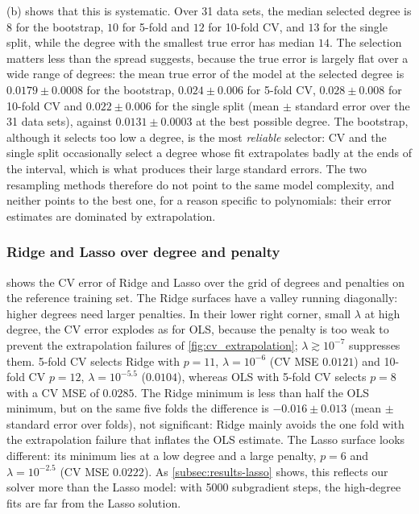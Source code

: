 (b) shows that this is systematic. Over 31 data sets,
the median selected degree is $8$ for the bootstrap, $10$ for 5-fold and $12$ for
10-fold CV, and $13$ for the single split, while the degree with the smallest
true error has median $14$. The selection matters less than the spread
suggests, because the true error is largely flat over a wide range of degrees: the mean
true error of the model at the selected degree is $0.0179\pm0.0008$ for the
bootstrap, $0.024\pm0.006$ for 5-fold CV, $0.028\pm0.008$ for 10-fold CV and
$0.022\pm0.006$ for the single split (mean $\pm$ standard error over the 31 data
sets), against $0.0131\pm0.0003$ at the best possible degree. The bootstrap,
although it selects too low a degree, is the most \emph{reliable} selector: CV
and the single split occasionally select a degree whose fit extrapolates badly
at the ends of the interval, which is what produces their large standard
errors. The two resampling methods therefore do not point to the same model
complexity, and neither points to the best one, for a reason specific to
polynomials: their error estimates are dominated by extrapolation.

\subsubsection{Ridge and Lasso over degree and penalty}
 shows the CV error of Ridge and Lasso over the grid of
degrees and penalties on the reference training set. The Ridge surfaces have a
valley running diagonally: higher degrees need larger penalties. In their lower
right corner, small $\lambda$ at high degree, the CV error explodes as for OLS,
because the penalty is too weak to prevent the extrapolation failures of
\cref{fig:cv_extrapolation}; $\lambda \gtrsim 10^{-7}$ suppresses them. 5-fold
CV selects Ridge with $p = 11$, $\lambda = 10^{-6}$ (CV MSE $0.0121$) and
10-fold CV $p = 12$, $\lambda = 10^{-5.5}$ ($0.0104$), whereas OLS with 5-fold
CV selects $p = 8$ with a CV MSE of $0.0285$. The Ridge minimum is less than
half the OLS minimum, but on the same five folds the difference is $-0.016 \pm
0.013$ (mean $\pm$ standard error over folds), not significant: Ridge mainly
avoids the one fold with the extrapolation failure that inflates the OLS
estimate. The Lasso surface looks different: its minimum lies at a low degree
and a large penalty, $p = 6$ and $\lambda = 10^{-2.5}$ (CV MSE $0.0222$).
As \cref{subsec:results-lasso} shows, this reflects our solver more than the
Lasso model: with 5000 subgradient steps, the high-degree fits are far from the
Lasso solution.

